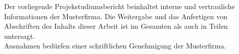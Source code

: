 \begin{non-disclosure-notice}
    Der vorliegende Projekstudiumsbericht beinhaltet interne und vertrauliche Informationen der Musterfirma.
    Die Weitergabe und das Anfertigen von Abschriften des Inhalts dieser Arbeit ist im Gesamten als auch in Teilen untersagt.\\

    Ausnahmen bedürfen einer schriftlichen Genehmigung der Musterfirma.
\end{non-disclosure-notice}
